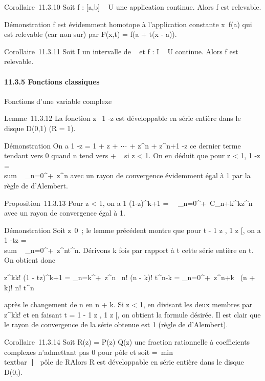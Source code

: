 \documentclass[]{article}
\begin{document}
Corollaire~11.3.10 Soit f : {[}a,b{]} \rightarrow~ U une application continue.
Alors f est relevable.

Démonstration f est évidemment homotope à l'application constante
x\mapsto~f(a) qui est relevable (car non sur\jmathective)
par F(x,t) = f(a + t(x - a)).

Corollaire~11.3.11 Soit I un intervalle de ~ et f : I \rightarrow~ U continue.
Alors f est relevable.

\paragraph{11.3.5 Fonctions classiques}

Fonctions d'une variable complexe

Lemme~11.3.12 La fonction z\mapsto~ 1
-z est développable en série entière dans le
disque D(0,1) (R = 1).

Démonstration On a  1 -z = 1 + z +
⋯ + z^n + z^n+1
-z ce dernier terme tendant vers 0 quand n tend
vers + \infty~ si \textbar{}z\textbar{} \textless{} 1. On en déduit que pour
\textbar{}z\textbar{} \textless{} 1,  1 -z
= \\sum ~
\_n=0^+\infty~z^n avec un rayon de convergence
évidemment égal à 1 par la règle de d'Alembert.

Proposition~11.3.13 Pour \textbar{}z\textbar{} \textless{} 1, on a  1
\over (1-z)^k+1 =\
\sum ~
\_n=0^+\infty~C\_n+k^kz^n avec un rayon
de convergence égal à 1.

Démonstration Soit z\neq~0~; le lemme précédent
montre que pour t \in{]} - 1 \over
\textbar{}z\textbar{} , 1 \over
\textbar{}z\textbar{} {[}, on a  1 -tz
= \\sum ~
\_n=0^+\infty~z^nt^n. Dérivons k fois par
rapport à t cette série entière en t. On obtient donc

 z^kk! \over (1 - tz)^k+1 =
\sum \_n=k^+\infty~z^n~ n!
\over (n - k)! t^n-k =
\sum \_n=0^+\infty~z^n+k~ (n +
k)! \over n! t^n

après le changement de n en n + k. Si \textbar{}z\textbar{} \textless{}
1, en divisant les deux membres par z^kk! et en faisant t = 1
\in{]} - 1 \over \textbar{}z\textbar{} , 1
\over \textbar{}z\textbar{} {[}, on obtient la formule
désirée. Il est clair que le rayon de convergence de la série obtenue
est 1 (règle de d'Alembert).

Corollaire~11.3.14 Soit R(z) = P(z) \over Q(z) une
fraction rationnelle à coefficients complexes n'admettant pas 0 pour
pôle et soit \rho =\
min\\textbar{}\alpha~\textbar{}∣\alpha~\text
pôle de R\. Alors R est développable en série entière
dans le disque D(0,\rho).
\end{document}
